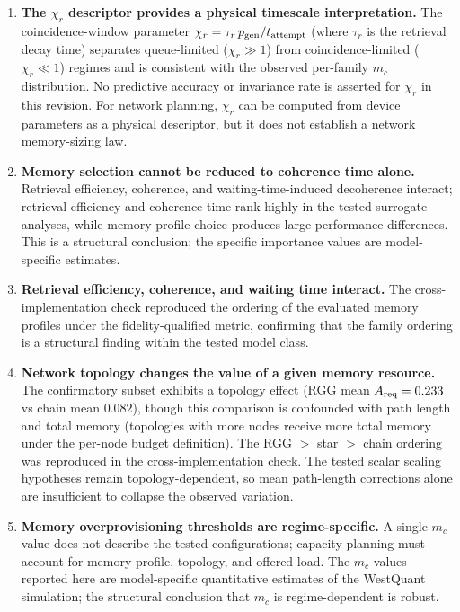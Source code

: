 \documentclass[quantumrep,article,submit,moreauthors]{Definitions/mdpi}
\begin{document}
\begin{enumerate}[leftmargin=2em]
\item \textbf{The $\chi_r$ descriptor provides a physical timescale interpretation.} The coincidence-window parameter $\chi_r = \tau_r\, p_{\rm gen} / t_{\rm attempt}$ (where $\tau_r$ is the retrieval decay time) separates queue-limited ($\chi_r \gg 1$) from coincidence-limited ($\chi_r \ll 1$) regimes and is consistent with the observed per-family $m_c$ distribution. No predictive accuracy or invariance rate is asserted for $\chi_r$ in this revision. For network planning, $\chi_r$ can be computed from device parameters as a physical descriptor, but it does not establish a network memory-sizing law.

\item \textbf{Memory selection cannot be reduced to coherence time alone.} Retrieval efficiency, coherence, and waiting-time-induced decoherence interact; retrieval efficiency and coherence time rank highly in the tested surrogate analyses, while memory-profile choice produces large performance differences. This is a structural conclusion; the specific importance values are model-specific estimates.

\item \textbf{Retrieval efficiency, coherence, and waiting time interact.} The cross-implementation check reproduced the ordering of the evaluated memory profiles under the fidelity-qualified metric, confirming that the family ordering is a structural finding within the tested model class.

\item \textbf{Network topology changes the value of a given memory resource.} The confirmatory subset exhibits a topology effect (RGG mean $A_{\rm req}=0.233$ vs chain mean $0.082$), though this comparison is confounded with path length and total memory (topologies with more nodes receive more total memory under the per-node budget definition). The RGG $>$ star $>$ chain ordering was reproduced in the cross-implementation check. The tested scalar scaling hypotheses remain topology-dependent, so mean path-length corrections alone are insufficient to collapse the observed variation.

\item \textbf{Memory overprovisioning thresholds are regime-specific.} A single $m_c$ value does not describe the tested configurations; capacity planning must account for memory profile, topology, and offered load. The $m_c$ values reported here are model-specific quantitative estimates of the WestQuant simulation; the structural conclusion that $m_c$ is regime-dependent is robust.


\end{enumerate}
\end{document}
